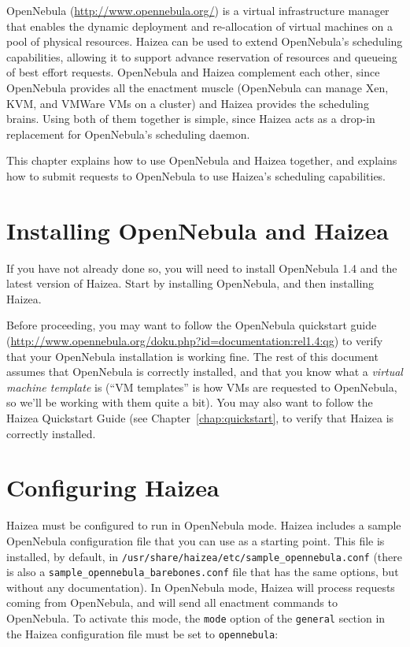 OpenNebula (\url{http://www.opennebula.org/}) is a virtual infrastructure manager that enables the dynamic deployment and re-allocation of virtual machines on a pool of physical resources. Haizea can be used to extend OpenNebula's scheduling capabilities, allowing it to support advance reservation of resources and queueing of best effort requests. OpenNebula and Haizea complement each other, since OpenNebula provides all the enactment muscle (OpenNebula can manage Xen, KVM, and VMWare VMs on a cluster) and Haizea provides the scheduling brains. Using both of them together is simple, since Haizea acts as a drop-in replacement for OpenNebula's scheduling daemon. 

This chapter explains how to use OpenNebula and Haizea together, and explains how to submit requests to OpenNebula to use Haizea's scheduling capabilities.

\section{Installing OpenNebula and Haizea}

If you have not already done so, you will need to install OpenNebula 1.4 and the latest version of Haizea. Start by installing OpenNebula, and then installing Haizea.

Before proceeding, you may want to follow the OpenNebula quickstart guide (\url{http://www.opennebula.org/doku.php?id=documentation:rel1.4:qg}) to verify that your OpenNebula installation is working fine. The rest of this document assumes that OpenNebula is correctly installed, and that you know what a \emph{virtual machine template} is (``VM templates'' is how VMs are requested to OpenNebula, so we'll be working with them quite a bit). You may also want to follow the Haizea Quickstart Guide (see Chapter~\ref{chap:quickstart}, to verify that Haizea is correctly installed.

\section{Configuring Haizea}

Haizea must be configured to run in OpenNebula mode. Haizea includes a sample OpenNebula configuration file that you can use as a starting point. This file is installed, by default, in \texttt{/usr/share/haizea/etc/sample\_opennebula.conf} (there is also a \texttt{sample\_opennebula\_barebones.conf} file that has the same options, but without any documentation). In OpenNebula mode, Haizea will process requests coming from OpenNebula, and will send all enactment commands to OpenNebula. To activate this mode, the \texttt{mode} option of the \texttt{general} section in the Haizea configuration file must be set to \texttt{opennebula}:

